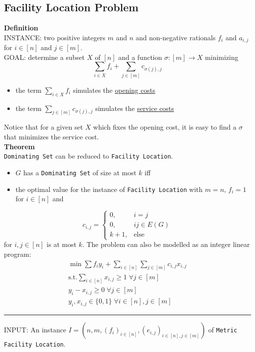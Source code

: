 \documentclass[a4paper, 12pt]{article}
\begin{document}
	\subsection{Facility Location Problem}
	\textbf{Definition}\\
	INSTANCE: two positive integers $m$ and $n$ and non-negative rationals $f_i$ and $a_{i,j}$ for $i \in [n]$ and $j \in [m]$.\\
	GOAL: determine a subset $X$ of $[n]$ and a function $\sigma: [m] \to X$ minimizing \[\sum_{i \in X} f_i + \sum_{j \in [m]} c_{\sigma(j),j}\]
	\begin{itemize}
		\item the term $\sum_{i \in X} f_i$ simulates the \underline{opening costs}
		\item the term $\sum_{j \in [m]} c_{\sigma(j),j}$ simulates the \underline{service costs}
	\end{itemize}
	Notice that for a given set $X$ which fixes the opening cost, it is easy to find a $\sigma$ that minimizes the service cost.\\
	\textbf{Theorem}\\
	\texttt{Dominating Set} can be reduced to \texttt{Facility Location}.
	\begin{itemize}
		\item $G$ has a \texttt{Dominating Set} of size at most $k$ iff 
		\item the optimal value for the instance of \texttt{Facility Location} with $m = n$, $f_i = 1$ for $i \in [n]$ and 
	\end{itemize}
	\[c_{i,j} = \begin{cases}
		0, & i = j\\
		0, & i	j \in E(G)\\
		k+1, & \text{else}
	\end{cases}\] for $i,j \in [n]$ is at most $k$.
	The problem can also be modelled as an integer linear program: \begin{align*}
		\min \sum f_i y_i + \sum_{i\in [n]}\sum_{j \in [m]} c_{i,j} x_{i,j}\\
		\text{s.t.} \sum_{i\in [n]}x_{i,j} \geq 1 \;\forall j \in [m]\\
		y_i - x_{i,j} \geq 0 \;\forall j \in [m]\\
		y_i, x_{i,j} \in \{0,1\} \;\forall i \in [n], j \in [m]
	\end{align*}
	\par\noindent\rule{\textwidth}{0.4pt}
	INPUT: An instance $I = (n,m,(f_i)_{i \in [n]}, (e_{i,j})_{i \in [n], j \in [m]})$ of \texttt{Metric Facility Location}.
\end{document}
